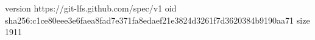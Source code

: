 version https://git-lfs.github.com/spec/v1
oid sha256:c1ce80eee3e6faea8fad7e371fa8edaef21e3824d3261f7d3620384b9190aa71
size 1911
